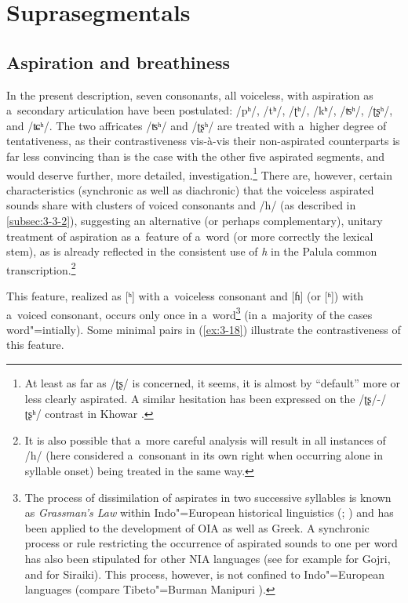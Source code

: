 \section{Suprasegmentals}
\label{sec:3-4}

\subsection{Aspiration and breathiness}
\label{subsec:3-4-1}

In the present description, seven consonants, all voiceless, with aspiration as a~secondary articulation have been postulated: /pʰ/, /tʰ/, /ʈʰ/, /kʰ/, /ʦʰ/, /ʈʂʰ/, and /ʨʰ/. The two affricates /ʦʰ/ and /ʈʂʰ/ are treated with a~higher degree of tentativeness, as their contrastiveness vis-à-vis their non-aspirated counterparts is far less convincing than is the case with the other five aspirated segments, and would deserve further, more detailed, investigation.\footnote{At least as far as /ʈʂ/ is concerned, it seems, it is almost by ``default'' more or less clearly aspirated. A similar hesitation has been expressed on the /ʈʂ/-/ʈʂʰ/ contrast in Khowar \citep[239]{endresenkristiansen1981}.} There are, however, certain characteristics (synchronic as well as diachronic) that the voiceless aspirated sounds share with clusters of voiced consonants and /h/ (as described in \ref{subsec:3-3-2}), suggesting an alternative (or perhaps complementary), unitary treatment of aspiration as a~feature of a~word (or more correctly the lexical stem), as is already reflected in the consistent use of \textit{h} in the Palula common transcription.\footnote{It is also possible that a~more careful analysis will result in all instances of /h/ (here considered a~consonant in its own right when occurring alone in syllable onset) being treated in the same way.} 


This feature, realized as [ʰ] with a~voiceless consonant and [ɦ] (or [ʱ]) with a~voiced consonant, occurs only once in a~word\footnote{\label{fnt:ftn32} The process of dissimilation of aspirates in two successive syllables is known as \textit{Grassman's Law} within Indo"=European historical linguistics (\citealt[19, 56]{szemerenyi1996}; \citealt[153--154, 162--163]{lehmann1992}) and has been applied to the development of OIA as well as Greek. A synchronic process or rule restricting the occurrence of aspirated sounds to one per word has also been stipulated for other NIA languages (see for example \citet[32]{losey2002} for Gojri, and \citet[34--35]{shackle1976} for Siraiki). This process, however, is not confined to Indo"=European languages (compare Tibeto"=Burman Manipuri \citep[13--14]{bhatningomba1997}).} (in a~majority of the cases word"=intially). Some minimal pairs in (\ref{ex:3-18}) illustrate the contrastiveness of this feature.


